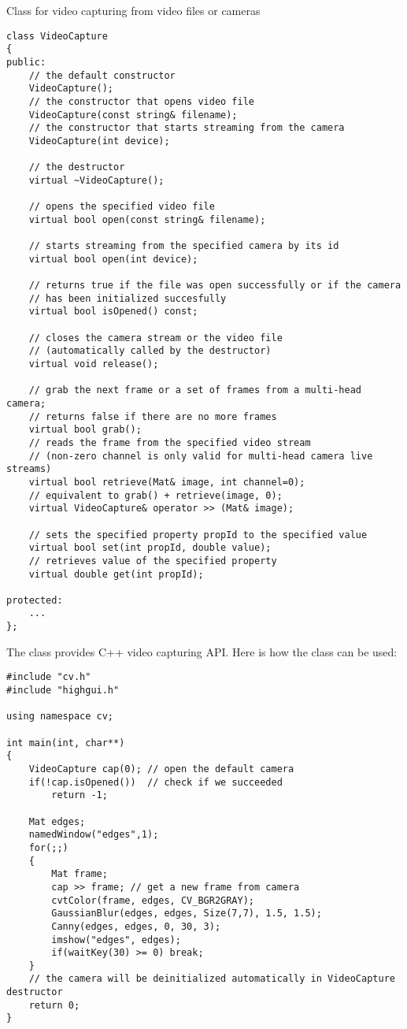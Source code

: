 Class for video capturing from video files or cameras

\begin{lstlisting}
class VideoCapture
{
public:
    // the default constructor
    VideoCapture();
    // the constructor that opens video file
    VideoCapture(const string& filename);
    // the constructor that starts streaming from the camera
    VideoCapture(int device);
    
    // the destructor
    virtual ~VideoCapture();
    
    // opens the specified video file
    virtual bool open(const string& filename);
    
    // starts streaming from the specified camera by its id
    virtual bool open(int device);
    
    // returns true if the file was open successfully or if the camera
    // has been initialized succesfully
    virtual bool isOpened() const;
    
    // closes the camera stream or the video file
    // (automatically called by the destructor)
    virtual void release();
    
    // grab the next frame or a set of frames from a multi-head camera;
    // returns false if there are no more frames
    virtual bool grab();
    // reads the frame from the specified video stream
    // (non-zero channel is only valid for multi-head camera live streams)
    virtual bool retrieve(Mat& image, int channel=0);
    // equivalent to grab() + retrieve(image, 0);
    virtual VideoCapture& operator >> (Mat& image);
    
    // sets the specified property propId to the specified value 
    virtual bool set(int propId, double value);
    // retrieves value of the specified property
    virtual double get(int propId);
    
protected:
    ...
};
\end{lstlisting}

The class provides C++ video capturing API. Here is how the class can be used:

\begin{lstlisting}
#include "cv.h"
#include "highgui.h"

using namespace cv;

int main(int, char**)
{
    VideoCapture cap(0); // open the default camera
    if(!cap.isOpened())  // check if we succeeded
        return -1;

    Mat edges;
    namedWindow("edges",1);
    for(;;)
    {
        Mat frame;
        cap >> frame; // get a new frame from camera
        cvtColor(frame, edges, CV_BGR2GRAY);
        GaussianBlur(edges, edges, Size(7,7), 1.5, 1.5);
        Canny(edges, edges, 0, 30, 3);
        imshow("edges", edges);
        if(waitKey(30) >= 0) break;
    }
    // the camera will be deinitialized automatically in VideoCapture destructor
    return 0;
}
\end{lstlisting}


